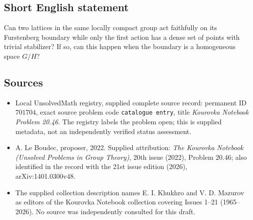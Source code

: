 \documentclass[11pt]{article}
\begin{document}
\subsection{Short English statement}
Can two lattices in the same locally compact group act faithfully on its Furstenberg boundary while only the first action has a dense set of points with trivial stabilizer? If so, can this happen when the boundary is a homogeneous space $G/H$?
\subsection{Sources}
\begin{itemize}
\item Local UnsolvedMath registry, supplied complete source record: permanent ID $701704$, exact source problem code \texttt{catalogue entry}, title \emph{Kourovka Notebook Problem 20.46}. The registry labels the problem open; this is supplied metadata, not an independently verified status assessment.
\item A. Le Boudec, proposer, 2022. Supplied attribution: \emph{The Kourovka Notebook (Unsolved Problems in Group Theory)}, 20th issue (2022), Problem 20.46; also identified in the record with the 21st issue edition (2026), arXiv:1401.0300v48.
\item The supplied collection description names E. I. Khukhro and V. D. Mazurov as editors of the Kourovka Notebook collection covering Issues 1--21 (1965--2026). No source was independently consulted for this draft.
\end{itemize}
\end{document}
